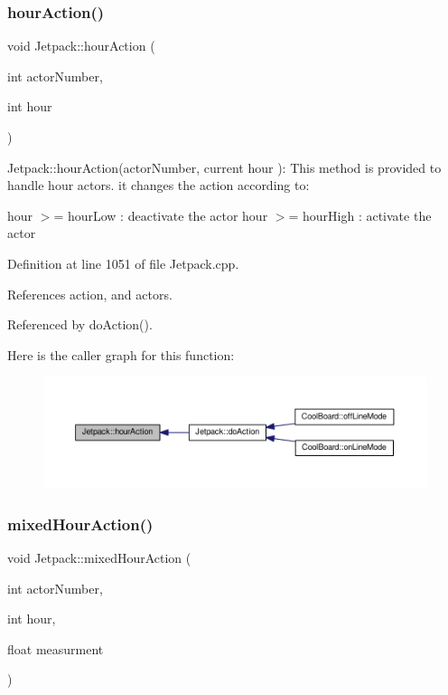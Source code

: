 \subsubsection{\texorpdfstring{hour\+Action()}{hourAction()}}
{\footnotesize\ttfamily void Jetpack\+::hour\+Action (\begin{DoxyParamCaption}\item[{int}]{actor\+Number,  }\item[{int}]{hour }\end{DoxyParamCaption})}

Jetpack\+::hour\+Action(actor\+Number, current hour )\+: This method is provided to handle hour actors. it changes the action according to\+:

hour $>$= hour\+Low \+: deactivate the actor hour $>$= hour\+High \+: activate the actor 

Definition at line 1051 of file Jetpack.\+cpp.



References action, and actors.



Referenced by do\+Action().

Here is the caller graph for this function\+:
\nopagebreak
\begin{figure}[H]
\begin{center}
\leavevmode
\includegraphics[width=350pt]{df/d1d/class_jetpack_acd6889af2fe5b057c6bd51b6dac827ef_icgraph}
\end{center}
\end{figure}
\mbox{\label{class_jetpack_ac1a49ab4867718cdb415ad74c2066b9d}} 
\subsubsection{\texorpdfstring{mixed\+Hour\+Action()}{mixedHourAction()}}
{\footnotesize\ttfamily void Jetpack\+::mixed\+Hour\+Action (\begin{DoxyParamCaption}\item[{int}]{actor\+Number,  }\item[{int}]{hour,  }\item[{float}]{measurment }\end{DoxyParamCaption})}

